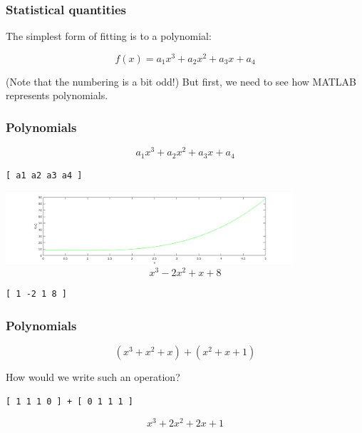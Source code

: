 \documentclass[11pt]{beamer}
\begin{document}
\begin{frame}[fragile]
  \frametitle{Statistical quantities}
  \Enlarge

  \begin{enumerate}
  \myitem  The simplest form of fitting is to a polynomial:
  \end{enumerate}
  $$
f(x) = a_{1} x^{3} + a_{2} x^{2} + a_{3} x + a_{4}
  $$
  \begin{enumerate}
  \myitem  (Note that the numbering is a bit odd!) %
  \myitem  But first, we need to see how MATLAB represents polynomials.
  \end{enumerate}
\end{frame}

\begin{frame}[fragile]
  \frametitle{Polynomials}
  \Enlarge

  $$
a_{1} x^{3} + a_{2} x^{2} + a_{3} x + a_{4}
  $$
  \begin{Verbatim}
[ a1 a2 a3 a4 ]
  \end{Verbatim}
  \includegraphics[width=0.8\textwidth]{./img/poly.png}
  $$
x^{3} - 2 x^{2} + x + 8
  $$
  \begin{Verbatim}
[ 1 -2 1 8 ]
  \end{Verbatim}
\end{frame}

\begin{frame}[fragile]
  \frametitle{Polynomials}
  \Enlarge

  $$
\left(x^{3} + x^{2} + x\right)
+
\left(x^{2} + x + 1\right)
  $$
  \begin{enumerate}
  \myitem  How would we write such an operation?
  \end{enumerate}
  \begin{Verbatim}
[ 1 1 1 0 ] + [ 0 1 1 1 ]
  \end{Verbatim}
  $$
x^{3} + 2 x^{2} + 2 x + 1
  $$
\end{frame}
\end{document}

